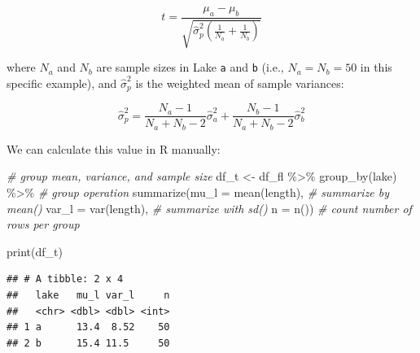 \documentclass[
]{book}
\newenvironment{Shaded}{\begin{snugshade}}{\end{snugshade}}
\newcommand{\AttributeTok}[1]{\textcolor[rgb]{0.77,0.63,0.00}{#1}}
\newcommand{\CommentTok}[1]{\textcolor[rgb]{0.56,0.35,0.01}{\textit{#1}}}
\newcommand{\FunctionTok}[1]{\textcolor[rgb]{0.00,0.00,0.00}{#1}}
\newcommand{\NormalTok}[1]{#1}
\newcommand{\OtherTok}[1]{\textcolor[rgb]{0.56,0.35,0.01}{#1}}
\newcommand{\SpecialCharTok}[1]{\textcolor[rgb]{0.00,0.00,0.00}{#1}}
\begin{document}
\[
t = \frac{\mu_a - \mu_b}{\sqrt{\hat{\sigma}^2_p \left(\frac{1}{N_a} + \frac{1}{N_b}\right)}}
\]

where \(N_a\) and \(N_b\) are sample sizes in Lake \texttt{a} and \texttt{b} (i.e., \(N_a = N_b = 50\) in this specific example), and \(\hat{\sigma}^2_p\) is the weighted mean of sample variances:

\[
\hat{\sigma}^2_p = \frac{N_a-1}{N_a + N_b - 2}\hat{\sigma}^2_a + \frac{N_b-1}{N_a + N_b - 2}\hat{\sigma}^2_b
\]

We can calculate this value in R manually:

\begin{Shaded}
\begin{Highlighting}[]
\CommentTok{\# group mean, variance, and sample size}
\NormalTok{df\_t }\OtherTok{\textless{}{-}}\NormalTok{ df\_fl }\SpecialCharTok{\%\textgreater{}\%} 
  \FunctionTok{group\_by}\NormalTok{(lake) }\SpecialCharTok{\%\textgreater{}\%} \CommentTok{\# group operation}
  \FunctionTok{summarize}\NormalTok{(}\AttributeTok{mu\_l =} \FunctionTok{mean}\NormalTok{(length), }\CommentTok{\# summarize by mean()}
            \AttributeTok{var\_l =} \FunctionTok{var}\NormalTok{(length), }\CommentTok{\# summarize with sd()}
            \AttributeTok{n =} \FunctionTok{n}\NormalTok{()) }\CommentTok{\# count number of rows per group}

\FunctionTok{print}\NormalTok{(df\_t)}
\end{Highlighting}
\end{Shaded}

\begin{verbatim}
## # A tibble: 2 x 4
##   lake   mu_l var_l     n
##   <chr> <dbl> <dbl> <int>
## 1 a      13.4  8.52    50
## 2 b      15.4 11.5     50
\end{verbatim}
\end{document}
